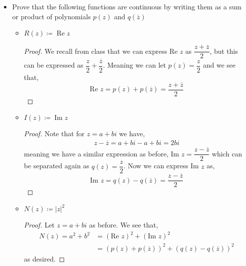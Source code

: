 \documentclass[11pt]{article}
\newenvironment{problem}[2][Problem\!]{\begin{trivlist}
\item[\hskip \labelsep {\bfseries #1}\hskip \labelsep {\bfseries #2}]}{\end{trivlist}}
\newcommand{\abs}[1]{\left\lvert#1\right\rvert} %
\renewcommand{\Re}{\operatorname{Re}}
\renewcommand{\Im}{\operatorname{Im}}
\begin{document}
\begin{problem}{3.2}
\begin{itemize}[itemsep=3em]
\item[(c)] Prove that the following functions are continuous by writing them as a sum or product of polynomials $p(z)$ and $q(\overline{z})$
\begin{itemize}[itemsep=2em]
\item[(i)] $R(z) \coloneqq \Re z$
\begin{proof}
  We recall from class that we can express Re $z$ as $\dfrac{z + \overline{z}}{2}$, but this can be expressed as $\dfrac{z}{2} + \dfrac{\overline{z}}{2}$. Meaning we can let $p(z) = \dfrac{z}{2}$ and we see that,
  \[\text{Re }z = p(z) + p(\overline{z}) = \dfrac{z + \overline{z}}{2}\]
\end{proof}
\newpage
\item[(ii)] $I(z) \coloneqq \Im z$
\begin{proof}
  Note that for $z = a + bi$ we have,
  \begin{align*}
    z - \overline{z} = a+bi - a + bi = 2bi
  \end{align*}
  meaning we have a similar expression as before, Im $z = \dfrac{z - \overline{z}}{2}$ which can be separated again as $q(z) = \dfrac{z}{2}$. Now we can express Im $z$ as,
  \[\text{Im }z = q(z) - q(\overline{z}) = \dfrac{z - \overline{z}}{2}\]
\end{proof}

\item[(iii)] $N(z) \coloneqq \abs{z}^2$
\begin{proof}
  Let $z = a + bi$ as before. We see that, 
  \begin{align*}
    N(z) = a^{2} + b^{2} &= (\text{Re }z)^{2} + (\text{Im }z)^{2} \\
    &= (p(z) + p(\overline{z}))^{2} + (q(z) - q(\overline{z}))^{2}
  \end{align*}
  as desired. 
\end{proof}

\end{itemize}
\end{itemize}
\end{problem}

\newpage  %
\end{document}
